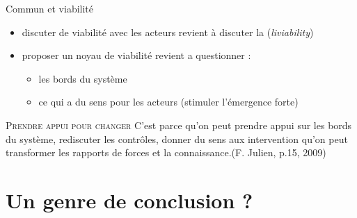 \documentclass[newPxFont]{beamer}
\begin{document}
\begin{frame}[c]{Commun et viabilité}
      \vspace{-1cm}
      \begin{itemize}
        \item discuter de viabilité avec les acteurs revient à discuter la (\textit{liviability})
        \item proposer un noyau de viabilité revient a questionner : 
        \begin{itemize}
          \item les bords du système
          \item ce qui a du sens pour les acteurs (stimuler l'émergence forte)
        \end{itemize}
      \end{itemize}
      \small{
         \begin{alertblock}{\textsc{Prendre appui pour changer}}
          C'est parce qu'on peut prendre appui sur les bords du système, rediscuter les contrôles, donner du sens aux intervention qu'on peut transformer les rapports de forces et la connaissance.(F. Julien, p.15, 2009)
         \end{alertblock}
       }
\end{frame}


\section{Un genre de conclusion ?}
\end{document}
